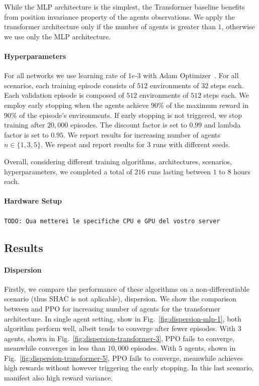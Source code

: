 While the MLP architecture is the simplest, the Transformer baseline benefits from position invariance property of the agents observations. We apply the transformer architecture only if the number of agents is greater than $1$, otherwise we use only the MLP architecture. 

\paragraph{Hyperparameters}
For all networks we use learning rate of $1e\text{-}3$ with Adam Optimizer~\cite{Kingma14}. For all scenarios, each training episode consists of $512$ environments of $32$ steps each. Each validation episode is composed of $512$ environments of $512$ steps each. We employ early stopping when the agents achieve $90\%$ of the maximum reward in $90\%$ of the episode's environments. If early stopping is not triggered, we stop training after $20,000$ episodes. The discount factor is set to $0.99$ and lambda factor is set to $0.95$. We report results for increasing number of agents $n\in\{1,3,5\}$. We repeat and report results for $3$ runs with different seeds.

Overall, considering different training algorithms, architectures, scenarios, hyperparameters, we completed a total of $216$ runs lasting between $1$ to $8$ hours each. 

\paragraph{Hardware Setup}
\texttt{\color{DarkOrchid}TODO: Qua metterei le specifiche CPU e GPU del vostro server}

\subsection{Results}

\paragraph{Dispersion}
Firstly, we compare the performance of these algorithms on a non-differentiable scenario (thus SHAC is not aplicable), dispersion. We show the comparison between \fname{} and PPO for increasing number of agents for the transformer architecture. In single agent setting, show in Fig.~\ref{fig:dispersion-mlp-1}, both algorithm perform well, albeit \fname{} tends to converge after fewer episodes. With $3$ agents, shown in Fig.~\ref{fig:dispersion-transformer-3}, PPO fails to converge, meanwhile \fname{} converges in less than $10,000$ episodes. With $5$ agents, shown in Fig.~\ref{fig:dispersion-transformer-5}, PPO fails to converge, meanwhile \fname{} achieves high rewards without however triggering the early stopping. In this last scenario, \fname{} manifest also high reward variance.


